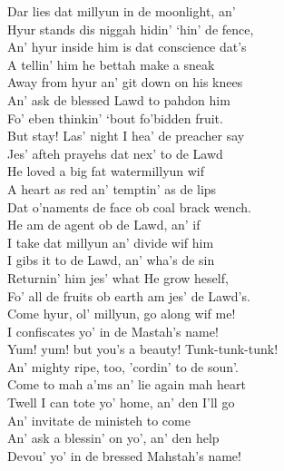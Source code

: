 \begin{ipquote}
Dar lies dat millyun in de moonlight, an’\\
Hyur stands dis niggah hidin’ ‘hin’ de fence,\\
An’ hyur inside him is dat conscience dat’s\\
A tellin’ him he bettah make a sneak\\
Away from hyur an’ git down on his knees\\
An’ ask de blessed Lawd to pahdon him\\
Fo’ eben thinkin’ ‘bout fo’bidden fruit.\\
But stay! Las’ night I hea’ de preacher say\\
Jes’ afteh prayehs dat nex’ to de Lawd\\
He loved a big fat watermillyun wif\\
A heart as red an’ temptin’ as de lips\\
Dat o’naments de face ob coal brack wench.\\
He am de agent ob de Lawd, an’ if\\
I take dat millyun an’ divide wif him\\
I gibs it to de Lawd, an’ wha’s de sin\\
Returnin’ him jes’ what He grow heself,\\
Fo’ all de fruits ob earth am jes’ de Lawd’s.\\
Come hyur, ol’ millyun, go along wif me!\\
I confiscates yo’ in de Mastah’s name!\\
Yum! yum! but you’s a beauty! Tunk-tunk-tunk!\\
An’ mighty ripe, too, ’cordin’ to de soun’.\\
Come to mah a’ms an’ lie again mah heart\\
Twell I can tote yo’ home, an’ den I’ll go\\
An’ invitate de ministeh to come\\
An’ ask a blessin’ on yo’, an’ den help\\
Devou’ yo’ in de bressed Mahstah’s name!
\end{ipquote}


